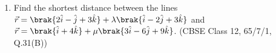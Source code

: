 \begin{enumerate}[label=\thesubsection.\arabic*, ref=\thesubsection.\theenumi]
\solution
\begin{align}
	\vec{b} + \vec{c} = \myvec{\lambda+2 \\ -6 \\ 2}, \qquad \abs{\vec{b}+\vec{c}} = \sqrt{\brak{\lambda+2}^2 + 40}
\end{align}
The scalar product with $\vec{a} = \myvec{1\\-1\\2}$ is
\begin{align}
	\frac{\vec{a}^{\top}\brak{\vec{b}+\vec{c}}}{\abs{\vec{b}+\vec{c}}} = \frac{\lambda + 2 + 6 + 4}{\sqrt{\brak{\lambda+2}^2 + 40}} = \frac{\lambda+12}{\sqrt{\brak{\lambda+2}^2+40}} = 1
\end{align}
Squaring,
\begin{align}
	\brak{\lambda+12}^2 = \brak{\lambda+2}^2 + 40 \implies 20\lambda = -100 \implies \lambda = -5
\end{align}
Check: $\lambda + 12 = 7 > 0$ and $\sqrt{9 + 40} = 7$, so the unsquared equation holds.
The following code verifies the solution
\begin{lstlisting}[frame=single, basicstyle=\rmfamily, escapeinside={(*@}{@*)}]
(*@\makebox[\dimexpr\linewidth-2\fboxsep-2\fboxrule\relax][c]{codes/31A.c}@*)
\end{lstlisting}

\item
Find the shortest distance between the lines $\vec{r} = \brak{2\hat{i} - \hat{j} + 3\hat{k}} + \lambda\brak{\hat{i} - 2\hat{j} + 3\hat{k}}$ and $\vec{r} = \brak{\hat{i} + 4\hat{k}} + \mu\brak{3\hat{i} - 6\hat{j} + 9\hat{k}}$.
\hfill (CBSE Class 12, 65/7/1, Q.31(B))


\end{enumerate}
